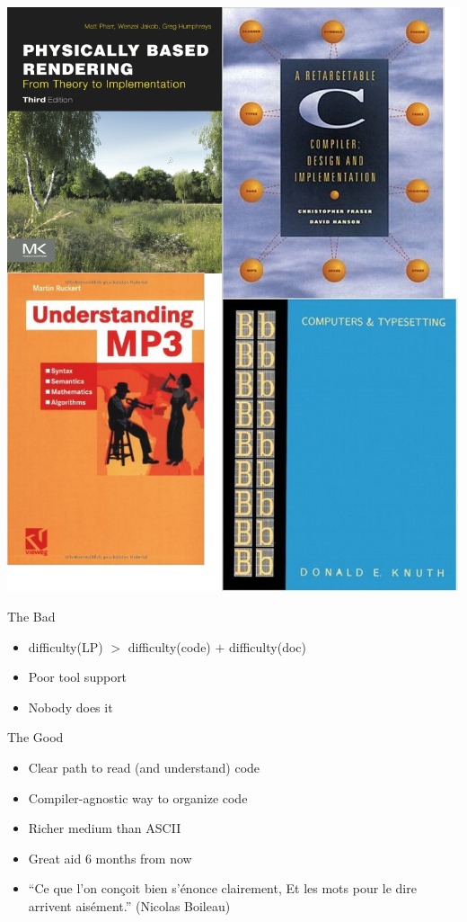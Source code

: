 \documentclass{beamer}
\newcommand{\vfbtitle}[1]{\begin{center}\Huge{#1}\end{center}}
\begin{document}
\begin{frame}
  \centering
  \includegraphics[scale=0.23]{media/lp-books.png}
\end{frame}

\begin{frame}
  \vfbtitle{The Bad}

  \begin{itemize}
    \item difficulty(LP) $>$ difficulty(code) $+$ difficulty(doc)
    \item Poor tool support
    \item Nobody does it
  \end{itemize}
\end{frame}


\begin{frame}
  \vfbtitle{The Good}

  \begin{itemize}
    \item Clear path to read (and understand) code
    \item Compiler-agnostic way to organize code
    \item Richer medium than ASCII
    \item Great aid 6 months from now
    \item ``Ce que l'on conçoit bien s'énonce clairement, Et les mots
    pour le dire arrivent aisément.'' (Nicolas Boileau)
  \end{itemize}
\end{frame}
\end{document}
